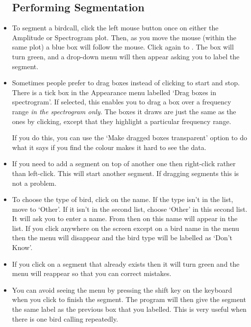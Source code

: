 \documentclass{article}
\begin{document}
\begin{itemize}
\subsection{Performing Segmentation}

\item To segment a birdcall, click the left mouse button once on either the Amplitude or Spectrogram plot. Then, as you move the mouse (within the same plot) a blue box will follow the mouse. Click again to  . The box will turn green, and a drop-down menu will then appear asking you to label the segment. 

\item Sometimes people prefer to drag boxes instead of clicking to start and stop. There is a tick box in the Appearance menu labelled `Drag boxes in spectrogram'. If selected, this enables you to drag a box over a frequency range {\em in the spectrogram only}. The boxes it draws are just the same as the ones by clicking, except that they highlight a particular frequency range. 

If you do this, you can use the `Make dragged boxes transparent' option to do what it says if you find the colour makes it hard to see the data.

\item If you need to add a segment on top of another one then right-click rather than left-click. This will start another segment. If dragging segments this is not a problem. 

\item To choose the type of bird, click on the name. If the type isn't in the list, move to `Other'. If it isn't in the second list, choose `Other' in this second list. It will ask you to enter a name. From then on this name will appear in the list. If you click anywhere on the screen except on a bird name in the menu then the menu will disappear and the bird type will be labelled as `Don't Know'.

\item If you click on a segment that already exists then it will turn green and the menu will reappear so that you can correct mistakes.

\item You can avoid seeing the menu by pressing the shift key on the keyboard when you click to finish the segment. The program will then give the segment the same label as the previous box that you labelled. This is very useful when there is one bird calling repeatedly.


\end{itemize}
\end{document}
